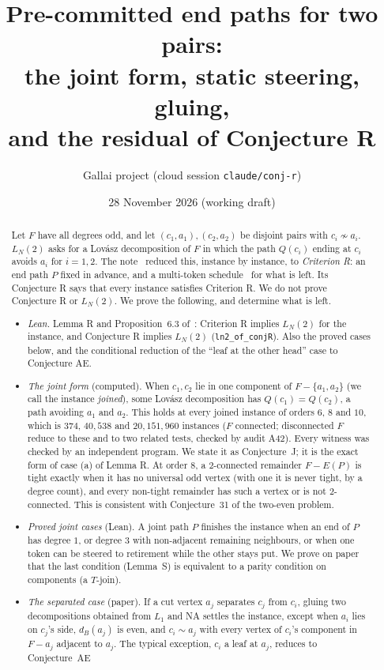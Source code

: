 \documentclass[11pt]{amsart}
\title[Conjecture R]{Pre-committed end paths for two pairs:\\
the joint form, static steering, gluing,\\ and the residual of Conjecture R}
\author{Gallai project (cloud session \texttt{claude/conj-r})}
\date{28 November 2026 (working draft)}
\theoremstyle{definition}
\begin{document}
\begin{abstract}
Let $F$ have all degrees odd, and let $(c_1,a_1),(c_2,a_2)$ be disjoint pairs with $c_i\not\sim a_i$.
$L_N(2)$ asks for a Lov\'asz decomposition of $F$ in which the path $Q(c_i)$ ending at $c_i$ avoids
$a_i$ for $i=1,2$. The note~\cite{LN} reduced this, instance by instance, to \emph{Criterion R}: an
end path $P$ fixed in advance, and a multi-token schedule~\cite{MT} for what is left. Its Conjecture R says that
every instance satisfies Criterion R. We do not prove Conjecture R or $L_N(2)$. We prove the
following, and determine what is left.
\begin{itemize}
\item \emph{Lean.} Lemma R and Proposition~6.3 of~\cite{LN}: Criterion R implies $L_N(2)$ for the
instance, and Conjecture R implies $L_N(2)$ (\texttt{ln2\_of\_conjR}). Also the proved cases below,
and the conditional reduction of the ``leaf at the other head'' case to Conjecture AE.
\item \emph{The joint form} (computed). When $c_1,c_2$ lie in one component of $F-\{a_1,a_2\}$ (we
call the instance \emph{joined}), some Lov\'asz decomposition has $Q(c_1)=Q(c_2)$, a path avoiding
$a_1$ and $a_2$. This holds at every joined instance of orders $6$, $8$ and $10$, which is $374$,
$40{,}538$ and $20{,}151{,}960$ instances ($F$ connected; disconnected $F$ reduce to these and to two
related tests, checked by audit A42). Every witness was checked by an independent program. We state it
as Conjecture~J; it is the exact form of case (a) of Lemma R. At order $8$, a $2$-connected remainder
$F-E(P)$ is tight exactly when it has no universal odd vertex (with one it is never tight, by a degree
count), and every non-tight remainder has such a vertex or is not $2$-connected. This is consistent
with Conjecture~31 of the two-even problem.
\item \emph{Proved joint cases} (Lean). A joint path $P$ finishes the instance when an end of $P$
has degree $1$, or degree $3$ with non-adjacent remaining neighbours, or when one token can be
steered to retirement while the other stays put. We prove on paper that the last condition
(Lemma~S) is equivalent to a parity condition on components (a $T$-join).
\item \emph{The separated case} (paper). If a cut vertex $a_j$ separates $c_j$ from $c_i$,
gluing two decompositions obtained from $L_1$ and NA settles the instance, except when $a_i$ lies on
$c_j$'s side, $d_B(a_j)$ is even, and $c_i\sim a_j$ with every vertex of $c_i$'s component in
$F-a_j$ adjacent to $a_j$. The typical exception, $c_i$ a leaf at $a_j$, reduces to Conjecture~AE

\end{itemize}
\end{abstract}
\end{document}
